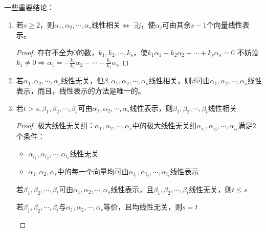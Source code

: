 \begin{property}[线性空间的性质]
    一些重要结论：
    \begin{enumerate}
        \item 
        \begin{conclusion}
            若$s \geq 2$，则$\alpha_1, \alpha_2, \cdots, \alpha_s$线性相关$\Leftrightarrow$ $\exists j$，使$\alpha_j$可由其余$s - 1$个向量线性表示。
            \begin{proof}
                存在不全为$0$的数，$k_1, k_2, \cdots, k_s$，使$k_1 \alpha_1 + k_2 \alpha_2 + \cdots + k_s \alpha_s = 0$
                不妨设$k_1 ≠ 0 \Rightarrow \alpha_1 = -\frac{k_1}{k_1} \alpha_2 - \cdots - \frac{k_s}{k_1} \alpha_s$
            \end{proof}
        \end{conclusion}

        \item
        \begin{conclusion}
            若$\alpha_1, \alpha_2, \cdots, \alpha_s$线性无关，但$\beta, \alpha_1, \alpha_2, \cdots, \alpha_s$线性相关，则$\beta$可由$\alpha_1, \alpha_2, \cdots, \alpha_s$线性表示，而且，线性表示的方法是唯一的。
        \end{conclusion}

        \item
        \begin{conclusion}
            若$t>s, \beta_1, \beta_2, \cdots, \beta_s$可由$\alpha_1, \alpha_2, \cdots, \alpha_s$线性表示，则$\beta_1, \beta_2, \cdots, \beta_t$线性相关
            \begin{proof}
                极大线性无关组：$\alpha_1, \alpha_2, \cdots, \alpha_s$中的极大线性无关组$\alpha_{i_1}, \alpha_{i_2}, \cdots, \alpha_{i_r}$满足$2$个条件：
                \begin{itemize}
                    \item[\circled{1}] $\alpha_{i_1}, \alpha_{i_2}, \cdots, \alpha_{i_r}$线性无关
                    \item[\circled{2}] $\alpha_1, \alpha_2, \alpha_s$中的每一个向量均可由$\alpha_{i_1}, \alpha_{i_2}, \cdots, \alpha_{i_r}$线性表示  
                \end{itemize}
                \begin{corollary}
                    若$\beta_1, \beta_2, \cdots, \beta_t$可由$\alpha_1, \alpha_2, \cdots, \alpha_s$线性表示，且$\beta_1, \beta_2, \cdots, \beta_t$线性无关，则$t \leq s$
                \end{corollary}
                \begin{corollary}
                    若$\beta_1, \beta_2, \cdots, \beta_t$与$\alpha_1, \alpha_2, \cdots, \alpha_s$等价，且均线性无关，则$s = t$
                \end{corollary}
            \end{proof}
        \end{conclusion}
    \end{enumerate}


\end{property}
